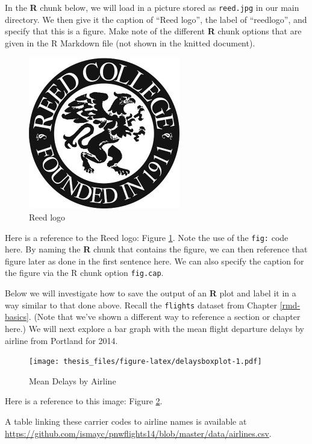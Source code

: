 \documentclass[12pt,twoside]{reedthesis}
\begin{document}
In the \textbf{R} chunk below, we will load in a picture stored as \texttt{reed.jpg} in our main directory. We then give it the caption of ``Reed logo'', the label of ``reedlogo'', and specify that this is a figure. Make note of the different \textbf{R} chunk options that are given in the R Markdown file (not shown in the knitted document).
\begin{figure}

{\centering \includegraphics[width=0.2\linewidth]{figure/reed} 

}

\caption{Reed logo}\label{fig:reedlogo}
\end{figure}
Here is a reference to the Reed logo: Figure \ref{fig:reedlogo}. Note the use of the \texttt{fig:} code here. By naming the \textbf{R} chunk that contains the figure, we can then reference that figure later as done in the first sentence here. We can also specify the caption for the figure via the R chunk option \texttt{fig.cap}.

\clearpage

Below we will investigate how to save the output of an \textbf{R} plot and label it in a way similar to that done above. Recall the \texttt{flights} dataset from Chapter \ref{rmd-basics}. (Note that we've shown a different way to reference a section or chapter here.) We will next explore a bar graph with the mean flight departure delays by airline from Portland for 2014.
\begin{figure}
\centering
\texttt{[image: thesis\_files/figure-latex/delaysboxplot-1.pdf]}
\caption{\label{fig:delaysboxplot}Mean Delays by Airline}
\end{figure}
Here is a reference to this image: Figure \ref{fig:delaysboxplot}.

A table linking these carrier codes to airline names is available at \url{https://github.com/ismayc/pnwflights14/blob/master/data/airlines.csv}.

\clearpage
\end{document}
